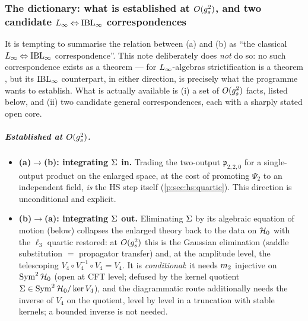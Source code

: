 \subsubsection{The dictionary: what is established at \texorpdfstring{$O(g_s^2)$}{O(gs2)},
and two candidate \texorpdfstring{$L_\infty\Leftrightarrow\mathrm{IBL}_\infty$}{L-IBL} correspondences}
\label{ped:sec:two:dict}

It is tempting to summarise the relation between (a) and (b) as \enquote{the classical
$L_\infty\Leftrightarrow\mathrm{IBL}_\infty$ correspondence}. This note deliberately does \emph{not} do so:
no such correspondence exists as a theorem --- for $L_\infty$-algebras strictification is a
theorem \cite{Borsten:2021:DoubleCopyHomotopy}, but its $\mathrm{IBL}_\infty$ counterpart, in either direction, is precisely
what the programme wants to establish. What is actually available is (i) a set of
$O(g_s^2)$ facts, listed below, and (ii) two candidate general correspondences,
each with a sharply stated open core.

\subparagraph{Established at $O(g_s^2)$.}
\begin{itemize}[leftmargin=*]
	\setlength{\itemsep}{0.6ex}

	\item \textbf{(a)$\to$(b): integrating $\Sigma$ in.} Trading the two-output
	$\mathfrak p_{2,2,0}$ for a single-output product on the enlarged space, at the cost of
	promoting $\Psi_2$ to an independent field, \emph{is} the HS step itself
	(\cref{p:sec:hs:quartic}). This direction is unconditional and explicit.

	\item \textbf{(b)$\to$(a): integrating $\Sigma$ out.} Eliminating $\Sigma$ by its algebraic
	equation of motion (below) collapses the enlarged theory back to the data on $\mathcal{H}_0$
	with the $\ell_3$ quartic restored: at $O(g_s^2)$ this is the Gaussian elimination
	(saddle substitution $=$ propagator transfer) and, at the amplitude
	level, the telescoping $V_4\circ V_4^{-1}\circ V_4=V_4$. It is
	\emph{conditional}: it needs $m_2$ injective on $\operatorname{Sym}^2\mathcal{H}_0$ (open
	at CFT level; defused by the kernel quotient $\Sigma\in\operatorname{Sym}^2\mathcal{H}_0/\ker V_4$), and the diagrammatic route additionally needs
	the inverse of $V_4$ on the quotient, level by level in a truncation with stable kernels; a bounded inverse is not needed.
\end{itemize}

